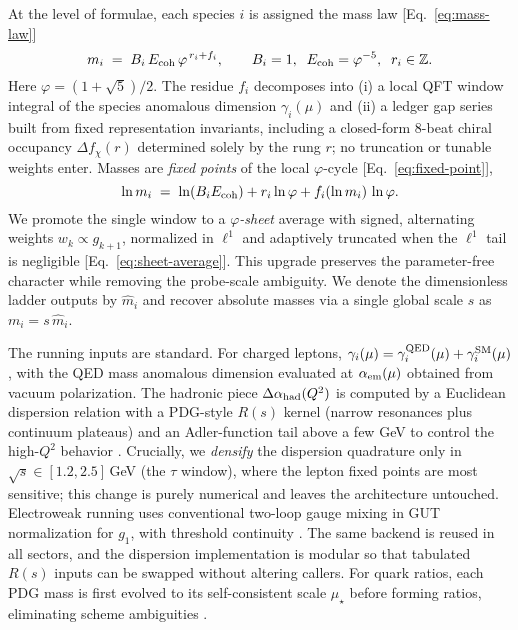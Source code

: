 \documentclass[11pt]{article}
\begin{document}
At the level of formulae, each species $i$ is assigned the mass law [Eq.~\eqref{eq:mass-law}]
\begin{equation}\label{eq:mass-law}
m_i \;=\; B_i\,E_{\rm coh}\,\varphi^{\,r_i + f_i}, \qquad B_i=1,\;\; E_{\rm coh}=\varphi^{-5},\;\; r_i\in\mathbb{Z}.
\end{equation}
Here $\varphi=(1+\sqrt{5})/2$. The residue $f_i$ decomposes into (i) a local QFT window integral of the species anomalous dimension $\gamma_i(\mu)$ and (ii) a ledger gap series built from fixed representation invariants, including a closed-form 8-beat chiral occupancy $\Delta f_\chi(r)$ determined solely by the rung $r$; no truncation or tunable weights enter. Masses are \emph{fixed points} of the local $\varphi$-cycle [Eq.~\eqref{eq:fixed-point}],
\begin{equation}\label{eq:fixed-point}
\ln m_i \;=\; \ln(B_iE_{\rm coh}) + r_i\ln\varphi + f_i(\ln m_i)\,\ln\varphi.
\end{equation}
We promote the single window to a \emph{$\varphi$-sheet} average with signed, alternating weights $w_k\propto g_{k+1}$, normalized in $\ell^1$ and adaptively truncated when the $\ell^1$ tail is negligible [Eq.~\eqref{eq:sheet-average}]. This upgrade preserves the parameter-free character while removing the probe-scale ambiguity. We denote the dimensionless ladder outputs by $\hat{m}_i$ and recover absolute masses via a single global scale $s$ as $m_i = s\,\hat{m}_i$.

The running inputs are standard. For charged leptons, $\gamma_i(\mu)=\gamma^{\rm QED}_i(\mu)+\gamma^{\rm SM}_i(\mu)$, with the QED mass anomalous dimension evaluated at $\alpha_{\rm em}(\mu)$ obtained from vacuum polarization. The hadronic piece $\Delta\alpha_{\rm had}(Q^2)$ is computed by a Euclidean dispersion relation with a PDG-style $R(s)$ kernel (narrow resonances plus continuum plateaus) and an Adler-function tail above a few GeV to control the high-$Q^2$ behavior \cite{EidelmanJegerlehner1995,Jegerlehner2003,Keshavarzi2020,Davier2017}. Crucially, we \emph{densify} the dispersion quadrature only in $\sqrt{s}\!\in[1.2,2.5]$\,GeV (the $\tau$ window), where the lepton fixed points are most sensitive; this change is purely numerical and leaves the architecture untouched. Electroweak running uses conventional two-loop gauge mixing in GUT normalization for $g_1$, with threshold continuity \cite{MachacekVaughn1983-85,Buttazzo2013}. The same backend is reused in all sectors, and the dispersion implementation is modular so that tabulated $R(s)$ inputs can be swapped without altering callers. For quark ratios, each PDG mass is first evolved to its self-consistent scale $\mu_\star$ before forming ratios, eliminating scheme ambiguities \cite{ChetyrkinKuehnSteinhauser2000,HerrenSteinhauser2018}.
\end{document}

